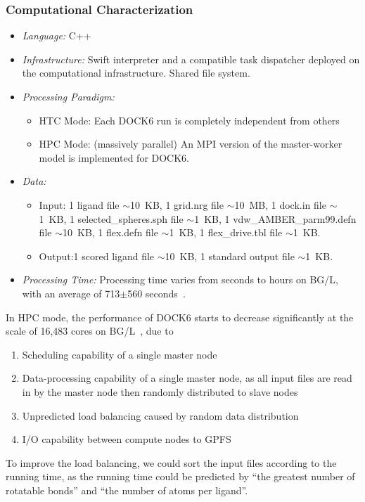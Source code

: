 \documentclass[10pt,letterpaper]{article}
\begin{document}
\subsubsection{Computational Characterization}
\begin {itemize}
\item {\em Language:} C++
\item {\em Infrastructure:} Swift interpreter and a compatible 
        task dispatcher deployed on the computational infrastructure.  
        Shared file system.
\item {\em Processing Paradigm:}
  \begin{itemize}
  \item HTC Mode: Each DOCK6 run is completely independent from others
  \item HPC Mode: (massively parallel) An MPI version of the master-worker model is implemented for DOCK6.
  \end{itemize}

\item {\em Data:}
  \begin{itemize}
  \item Input: 1 ligand file $\sim$10~KB, 1 grid.nrg file $\sim$10~MB, 1 dock.in file $\sim$1~KB,
    1 selected\_spheres.sph file $\sim$1~KB, 1 vdw\_AMBER\_parm99.defn file $\sim$10~KB,
    1 flex.defn file $\sim$1~KB, 1 flex\_drive.tbl file $\sim$1~KB.
  \item Output:1 scored ligand file $\sim$10~KB, 1 standard output file $\sim$1~KB.
  \end{itemize}

\item {\em Processing Time:} Processing time varies from seconds to hours on BG/L, with an average of 713$\pm$560 seconds~\cite{FALKON-SC-08}.
\end{itemize}

In HPC mode, the performance of DOCK6 starts to decrease significantly at the scale of 16,483 cores on BG/L~\cite{IBM-DOCK-08}, due to
    \begin{enumerate}
    \item Scheduling capability of a single master node
    \item Data-processing capability of a single master node, as all input files are read in by the master node then randomly distributed to slave nodes
    \item Unpredicted load balancing caused by random data distribution
    \item I/O capability between compute nodes to GPFS
    \end{enumerate}
To improve the load balancing, we could sort the input files according to the running time, as the running time could be predicted by ``the greatest number of rotatable bonds'' and ``the number of atoms per ligand''.
    
\end{document}
